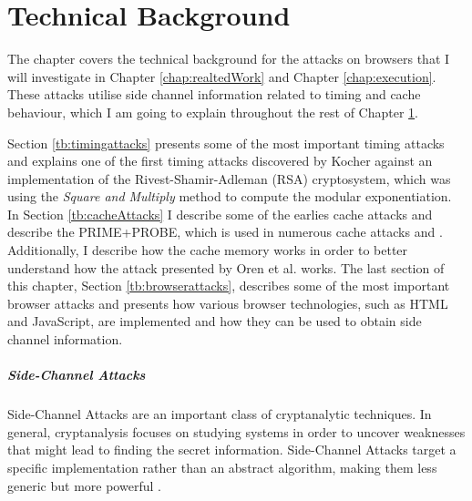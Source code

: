 \documentclass[10pt,a4paper,twoside]{book}
\begin{document}

\chapter{Technical Background}
\label{chap:technical}


The chapter covers the technical background for the attacks on browsers that I will investigate in Chapter \ref{chap:realtedWork} and Chapter \ref{chap:execution}. These attacks utilise side channel information related to timing and cache behaviour, which I am going to explain throughout the rest of Chapter \ref{chap:technical}. 

Section \ref{tb:timingattacks} presents some of the most important timing attacks and explains one of the first timing attacks discovered by Kocher\cite{kocher1996timing} against an implementation of the Rivest-Shamir-Adleman (RSA) \cite{rivest1978method} cryptosystem, which was using the \textit{Square and Multiply}\cite{menezes1996handbook} method to compute the modular exponentiation. In Section \ref{tb:cacheAttacks} I describe some of the earlies cache attacks and describe the PRIME+PROBE\cite{osvik2006cache}, which is used in numerous cache attacks \cite{osvik2006cache} and \cite{oren2015spy}. Additionally, I describe how the cache memory works in order to better understand how the attack presented by Oren et al.\cite{oren2015spy} works. The last section of this chapter, Section \ref{tb:browserattacks}, describes some of the most important browser attacks and presents how various browser technologies, such as HTML and JavaScript, are implemented and how they can be used to obtain side channel information.

\paragraph{Side-Channel Attacks}

Side-Channel Attacks are an important class of cryptanalytic techniques. In general, cryptanalysis focuses on studying systems in order to uncover weaknesses that might lead to finding the secret information. Side-Channel Attacks target a specific implementation rather than an abstract algorithm, making them less generic but more powerful \cite{standaert2010introduction}.
\end{document}
